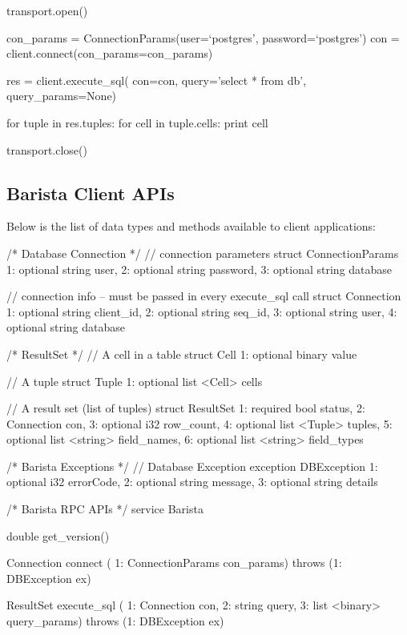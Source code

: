\documentclass[a4paper]{article}
\begin{document}
\begin{multicols}{2}
{{\begin{spverbatim}
transport.open()

con_params = ConnectionParams(user=`postgres', password=`postgres')
con = client.connect(con_params=con_params)

res  = client.execute_sql(
  con=con,
  query='select * from db',
  query_params=None)

for tuple in res.tuples:
  for cell in tuple.cells:
    print cell

transport.close()
\end{spverbatim}
}
}
\subsection{Barista Client APIs}
Below is the list of data types and methods available to client applications:
\tiny{
\begin{spverbatim}
/* Database Connection */
// connection parameters
struct ConnectionParams {
  1: optional string user,
  2: optional string password,
  3: optional string database
}

// connection info -- must be passed in every execute_sql call
struct Connection {
  1: optional string client_id,
  2: optional string seq_id,
  3: optional string user,
  4: optional string database
}


/* ResultSet */
// A cell in a table
struct Cell {
  1: optional binary value
}

// A tuple
struct Tuple {
  1: optional list <Cell> cells
}

// A result set (list of tuples)
struct ResultSet {
  1: required bool status,
  2: Connection con,
  3: optional i32 row_count,
  4: optional list <Tuple> tuples,
  5: optional list <string> field_names,
  6: optional list <string> field_types
}


/* Barista Exceptions */
// Database Exception
exception DBException {
  1: optional i32 errorCode,
  2: optional string message,
  3: optional string details
}


/* Barista RPC APIs */
service Barista {
  double get_version()

  Connection connect (
     1: ConnectionParams con_params) throws (1: DBException ex)

  ResultSet execute_sql (
     1: Connection con,
     2: string query,
     3: list <binary> query_params) throws (1: DBException ex)
}
\end{spverbatim}
}
\end{multicols}
\end{document}
